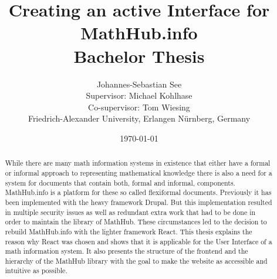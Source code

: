 \documentclass[11pt,a4paper]{article}
\title{Creating an active Interface for MathHub.info\\ \vspace{2 mm} Bachelor Thesis}
\author{Johannes-Sebastian See\\Supervisor: Michael Kohlhase\\Co-supervisor: Tom Wiesing\\Friedrich-Alexander University, Erlangen Nürnberg, Germany}
\date{\today}
\begin{document}
\begin{titlepage}
\maketitle
\begin{abstract}
\noindent While there are many math information systems in existence that either have a formal or informal approach to representing mathematical knowledge there is also a need for a system for documents that contain both, formal and informal, components.
MathHub.info is a platform for these so called flexiformal documents.
Previously it has been implemented with the heavy framework Drupal.
But this implementation resulted in multiple security issues as well as redundant extra work that had to be done in order to maintain the library of MathHub.
These circumstances led to the decision to rebuild MathHub.info with the lighter framework React.
\newline \newline
This thesis explains the reason why React was chosen and shows that it is applicable for the User Interface of a math information system.
It also presents the structure of the frontend and the hierarchy of the MathHub library with the goal to make the website as accessible and intuitive as possible.

\end{abstract}

\end{titlepage}

\tableofcontents
\pagebreak
\end{document}
